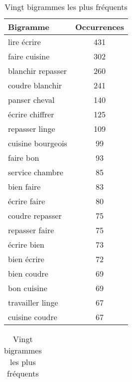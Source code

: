 \begin{table}[ht]
	\parbox{.45\linewidth}{
		\centering
		\begin{tabular}{lc}
			\hline
			\textbf{Bigramme} & \textbf{Occurrences} \\ \hline
			lire écrire                           & 431                  \\
			faire cuisine                         & 302                  \\
			blanchir repasser                     & 260                  \\
			coudre blanchir                       & 241                  \\
			panser cheval                         & 140                  \\
			écrire chiffrer                       & 125                  \\
			repasser linge                        & 109                  \\
			cuisine bourgeois                     & 99                   \\
			faire bon                             & 93                   \\
			service chambre                       & 85                   \\
			bien faire                            & 83                   \\
			écrire faire                          & 80                   \\
			coudre repasser                       & 75                   \\
			repasser faire                        & 75                   \\
			écrire bien                           & 73                   \\
			bien écrire                           & 72                   \\
			bien coudre                           & 69                   \\
			bon cuisine                           & 69                   \\
			travailler linge                      & 67                   \\
			cuisine coudre                        & 67                  \\
			\hline
		\end{tabular}
		\caption{Vingt bigrammes les plus fréquents}
	}
	\hfill
    \parbox{.45\linewidth}{
     	\centering
		\begin{tabular}{lc}

\end{tabular}}
\end{table}
